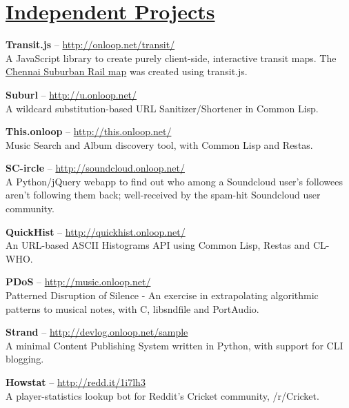 \documentclass[10pt,a4paper]{moderncv}
\begin{document}

\section{{\href{http://github.com/pranavrc/}{Independent Projects}}}

\cvlistitem
{\textbf{Transit.js} -- {{\href{http://onloop.net/transit}{\small http://onloop.net/transit/}}}
  \\A JavaScript library to create purely client-side, interactive transit maps. The {{\href{http://onloop.net/chennairail}{Chennai Suburban Rail map}}} was created using transit.js.}

\cvlistitem
{\textbf{Suburl} -- {{\href{http://u.onloop.net/}{\small
http://u.onloop.net/}}}
  \\A wildcard substitution-based URL Sanitizer/Shortener in Common Lisp.}

\cvlistitem
{\textbf{This.onloop} -- {{\href{http://this.onloop.net/}{\small http://this.onloop.net/}}}
  \\Music Search and Album discovery tool, with Common Lisp and Restas.}

\cvlistitem
{\textbf{SC-ircle} -- {{\href{http://soundcloud.onloop.net/}{\small http://soundcloud.onloop.net/}}}
  \\A Python/jQuery webapp to find out who among a Soundcloud user's followees aren't following them back; well-received by the spam-hit Soundcloud user community.}

\cvlistitem
{\textbf{QuickHist} -- {{\href{http://quickhist.onloop.net/}{\small http://quickhist.onloop.net/}}}
  \\An URL-based ASCII Histograms API using Common Lisp, Restas and CL-WHO.}

\cvlistitem
{\textbf{PDoS} -- {{\href{http://music.onloop.net/}{\small http://music.onloop.net/}}}
  \\Patterned Disruption of Silence - An exercise in extrapolating algorithmic patterns to musical notes, with C, libsndfile and PortAudio.}

\cvlistitem
{\textbf{Strand} -- {{\href{http://devlog.onloop.net/sample}{\small http://devlog.onloop.net/sample}}}
  \\A minimal Content Publishing System written in Python, with support for CLI blogging.}

\cvlistitem
{\textbf{Howstat} -- {{\href{http://redd.it/1i7lh3}{\small http://redd.it/1i7lh3}}}
  \\A player-statistics lookup bot for Reddit's Cricket community, /r/Cricket.}
\end{document}
